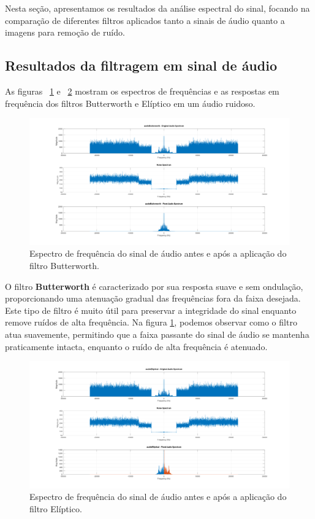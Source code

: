 Nesta seção, apresentamos os resultados da análise espectral do sinal, focando na comparação de diferentes filtros aplicados tanto a sinais de áudio quanto a imagens para remoção de ruído.

\subsection{Resultados da filtragem em sinal de áudio}
As figuras ~\ref{fig:audio_butterworth_spectrums} e ~\ref{fig:audio_elliptical_spectrums} mostram os espectros de frequências e as respostas em frequência dos filtros Butterworth e Elíptico em um áudio ruidoso.

\begin{figure}[H]
    \centering
    \includegraphics[width=1\linewidth]{03_results/assets/audio_butterworth_spectrums.png}
    \caption{Espectro de frequência do sinal de áudio antes e após a aplicação do filtro Butterworth.}
    \label{fig:audio_butterworth_spectrums}
\end{figure}

O filtro \textbf{Butterworth} é caracterizado por sua resposta suave e sem ondulação, proporcionando uma atenuação gradual das frequências fora da faixa desejada. Este tipo de filtro é muito útil para preservar a integridade do sinal enquanto remove ruídos de alta frequência. Na figura \ref{fig:audio_butterworth_spectrums}, podemos observar como o filtro atua suavemente, permitindo que a faixa passante do sinal de áudio se mantenha praticamente intacta, enquanto o ruído de alta frequência é atenuado.

\begin{figure}[H]
    \centering
    \includegraphics[width=1\linewidth]{03_results/assets/audio_elliptical_spectrums.png}
    \caption{Espectro de frequência do sinal de áudio antes e após a aplicação do filtro Elíptico.}
    \label{fig:audio_elliptical_spectrums}
\end{figure}

